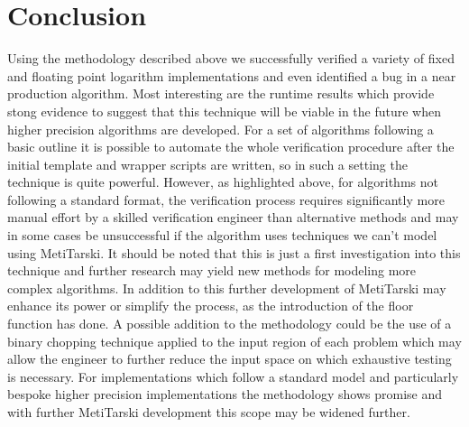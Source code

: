 \documentclass[a4]{article}
\begin{document}
\section{Conclusion}
Using the methodology described above we successfully verified a variety of fixed and floating point logarithm implementations and even identified a bug in a near production algorithm. Most interesting are the runtime results which provide stong evidence to suggest that this technique will be viable in the future when higher precision algorithms are developed. For a set of algorithms following a basic outline it is possible to automate the whole verification procedure after the initial template and wrapper scripts are written, so in such a setting the technique is quite powerful. However, as highlighted above, for algorithms not following a standard format, the verification process requires significantly more manual effort by a skilled verification engineer than alternative methods and may in some cases be unsuccessful if the algorithm uses techniques we can't model using MetiTarski. It should be noted that this is just a first investigation into this technique and further research may yield new methods for modeling more complex algorithms. In addition to this further development of MetiTarski may enhance its power or simplify the process, as the introduction of the floor function has done. A possible addition to the methodology could be the use of a binary chopping technique applied to the input region of each problem which may allow the engineer to further reduce the input space on which exhaustive testing is necessary. For implementations which follow a standard model and particularly bespoke higher precision implementations the methodology shows promise and with further MetiTarski development this scope may be widened further.


\end{document}
